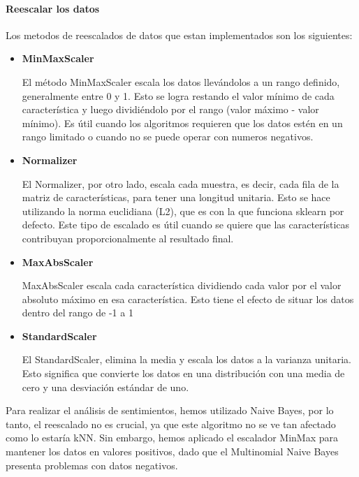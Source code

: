\documentclass{report}
\begin{document}
{            \paragraph*{Reescalar los datos} {Los metodos de reescalados de datos que estan implementados son los siguientes:
            \begin{itemize}
            \item \textbf{MinMaxScaler}   
            
            El método MinMaxScaler escala los datos llevándolos a un rango definido, generalmente entre 0 y 1. Esto se logra restando el valor mínimo de cada característica y luego dividiéndolo por el rango (valor máximo - valor mínimo). Es útil cuando los algoritmos requieren que los datos estén en un rango limitado o cuando no se puede operar con numeros negativos.

            \item \textbf{Normalizer}   
            
            El Normalizer, por otro lado, escala cada muestra, es decir, cada fila de la matriz de características, para tener una longitud unitaria. Esto se hace utilizando la norma euclidiana (L2), que es con la que funciona sklearn por defecto. Este tipo de escalado es útil cuando se quiere que las características contribuyan proporcionalmente al resultado final.
            
            \item \textbf{MaxAbsScaler}   
            
            MaxAbsScaler escala cada característica dividiendo cada valor por el valor absoluto máximo en esa característica. Esto tiene el efecto de situar los datos dentro del rango de -1 a 1
            
            \item \textbf{StandardScaler}   
            
            El StandardScaler, elimina la media y escala los datos a la varianza unitaria. Esto significa que convierte los datos en una distribución con una media de cero y una desviación estándar de uno.
            
            \end{itemize}
        Para realizar el análisis de sentimientos, hemos utilizado Naive Bayes, por lo tanto, el reescalado no es crucial, ya que este algoritmo no se ve tan afectado como lo estaría kNN. Sin embargo, hemos aplicado el escalador MinMax para mantener los datos en valores positivos, dado que el Multinomial Naive Bayes presenta problemas con datos negativos.
            }}
\end{document}
